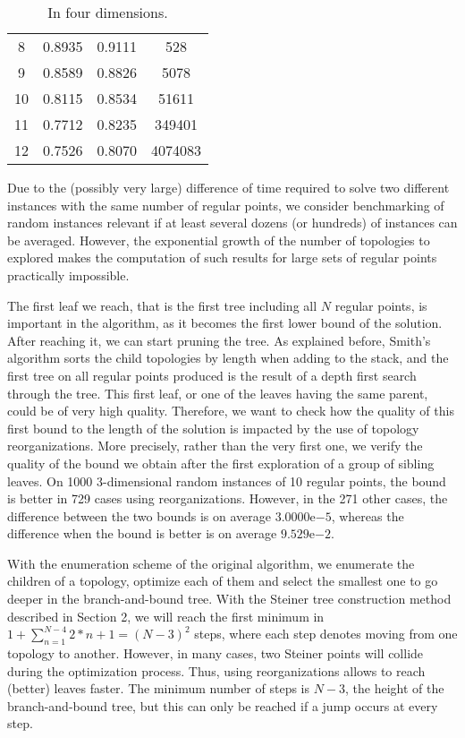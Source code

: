 \documentclass{article}
\theoremstyle{plain}
\begin{document}
\begin{table}
\begin{footnotesize}
\begin{subtable}[t]{\textwidth}
\begin{tabular}{c|c|c|c}
		8 & 0.8935 & 0.9111 & 528\\

		9 & 0.8589 & 0.8826 & 5078\\

		10 & 0.8115 & 0.8534 & 51611\\

		11 & 0.7712 & 0.8235 & 349401\\

		12 & 0.7526 & 0.8070 & 4074083\\
		\end{tabular}
		\caption{In four dimensions.}\label{tab:4d}
	\end{subtable}
	
\end{footnotesize}
\end{table}

Due to the (possibly very large) difference of time required to solve two different instances with the same number of regular points, we consider benchmarking of random instances relevant if at least several dozens (or hundreds) of instances can be averaged. 
However, the exponential growth of the number of topologies to explored makes the computation of such results for large sets of regular points practically impossible.

The first leaf we reach, that is the first tree including all $N$ regular points, is important in the algorithm, as it becomes the first lower bound of the solution. 
After reaching it, we can start pruning the tree. 
As explained before, Smith's algorithm sorts the child topologies by length when adding to the stack, and the first tree on all regular points produced is the result of a depth first search through the tree. 
This first leaf, or one of the leaves having the same parent, could be of very high quality. 
Therefore, we want to check how the quality of this first bound to the length of the solution is impacted by the use of topology reorganizations. 
More precisely, rather than the very first one, we verify the quality of the bound we obtain after the first exploration of a group of sibling leaves.
On 1000 3-dimensional random instances of 10 regular points, the bound is better in 729 cases using reorganizations. 
However, in the 271 other cases, the difference between the two bounds is on average $3.0000\mathrm{e}{-5}$, whereas the difference when the bound is better is on average $9.529\mathrm{e}{-2}$. 

With the enumeration scheme of the original algorithm, we enumerate the children of a topology, optimize each of them and select the smallest one to go deeper in the \mbox{branch-and-bound} tree. 
With the Steiner tree construction method described in Section 2, we will reach the first minimum in $1+ \sum\limits_{n=1}^{N-4} 2*n + 1 = (N - 3)^2$ steps, where each step denotes moving from one topology to another. 
However, in many cases, two Steiner points will collide during the optimization process. 
Thus, using reorganizations allows to reach (better) leaves faster. 
The minimum number  of steps is $N - 3$, the height of the \mbox{branch-and-bound} tree, but this can only be reached if a jump occurs at every step.
\end{document}
